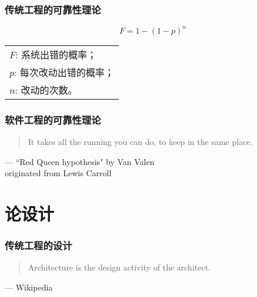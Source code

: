 \documentclass[UTF8,lualatex]{ctexbeamer}
\newcommand{\pagequote}[2]{
  \Large
  \begin{quotation}
      #1
  \end{quotation}
  \flushright\normalsize --- {#2}
}
\begin{document}
\begin{frame}
    \frametitle{传统工程的可靠性理论}
    \[
    F=1-(1-p)^n
    \]
    \begin{center}
        \begin{tabu}{l}
            $F$: 系统出错的概率；\\
            $p$: 每次改动出错的概率；\\
            $n$: 改动的次数。
        \end{tabu}
    \end{center}
\end{frame}


\begin{frame}
    \frametitle{软件工程的可靠性理论}
    \pagequote{It takes all the running you can do, to keep in the same place.}
        {``Red Queen hypothesis" by Van Valen\\originated from Lewis Carroll}
\end{frame}

\section{论设计}

\begin{frame}
    \frametitle{传统工程的设计}
    \pagequote{Architecture is the design activity of the architect.}{Wikipedia}
\end{frame}
\end{document}
